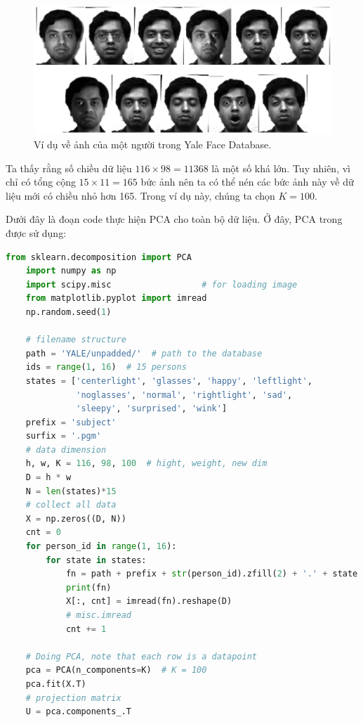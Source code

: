 \begin{figure}[t]
    \centering
    \includegraphics[width = \textwidth]{Chapters/07_DimemsionalityReduction/28_pca2/latex/yaleb_exs.pdf}
    \caption[]{Ví dụ về ảnh của một người trong Yale Face Database.}
    \label{fig:28_1}
\end{figure}

Ta thấy rằng số chiều dữ liệu $116 \times 98 = 11368$ là một số khá
lớn. Tuy nhiên, vì chỉ có tổng cộng $15 \times 11 = 165$ bức ảnh nên ta có thể
nén các bức ảnh này về dữ liệu mới có chiều nhỏ hơn 165. Trong ví dụ này, chúng
ta chọn $K = 100$.

Dưới đây là đoạn code thực hiện PCA cho toàn bộ dữ liệu. Ở đây, PCA trong  được sử dụng:
\newpage
\begin{lstlisting}[language=Python]
    from sklearn.decomposition import PCA
    import numpy as np
    import scipy.misc                  # for loading image
    from matplotlib.pyplot import imread
    np.random.seed(1)
    
    # filename structure
    path = 'YALE/unpadded/'  # path to the database
    ids = range(1, 16)  # 15 persons
    states = ['centerlight', 'glasses', 'happy', 'leftlight',
              'noglasses', 'normal', 'rightlight', 'sad',
              'sleepy', 'surprised', 'wink']
    prefix = 'subject'
    surfix = '.pgm'
    # data dimension
    h, w, K = 116, 98, 100  # hight, weight, new dim
    D = h * w
    N = len(states)*15
    # collect all data
    X = np.zeros((D, N))
    cnt = 0
    for person_id in range(1, 16):
        for state in states:
            fn = path + prefix + str(person_id).zfill(2) + '.' + state + surfix
            print(fn)
            X[:, cnt] = imread(fn).reshape(D)
            # misc.imread
            cnt += 1
    
    # Doing PCA, note that each row is a datapoint
    pca = PCA(n_components=K)  # K = 100
    pca.fit(X.T)
    # projection matrix
    U = pca.components_.T
    
\end{lstlisting}

